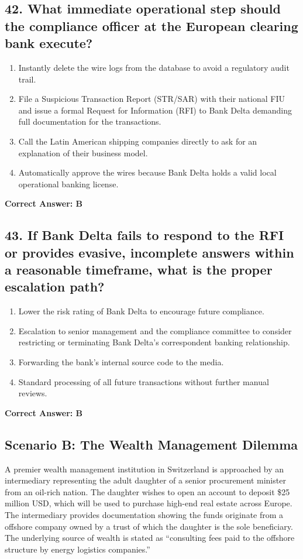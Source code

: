 \documentclass[11pt,a4paper]{article}
\begin{document}
	\subsection{42. What immediate operational step should the compliance officer at the European clearing bank execute?}
	\begin{enumerate}[label=\Alph*.]
		\item Instantly delete the wire logs from the database to avoid a regulatory audit trail.
		\item File a Suspicious Transaction Report (STR/SAR) with their national FIU and issue a formal Request for Information (RFI) to Bank Delta demanding full documentation for the transactions.
		\item Call the Latin American shipping companies directly to ask for an explanation of their business model.
		\item Automatically approve the wires because Bank Delta holds a valid local operational banking license.
	\end{enumerate}
	\textbf{Correct Answer: B}
	
	\subsection{43. If Bank Delta fails to respond to the RFI or provides evasive, incomplete answers within a reasonable timeframe, what is the proper escalation path?}
	\begin{enumerate}[label=\Alph*.]
		\item Lower the risk rating of Bank Delta to encourage future compliance.
		\item Escalation to senior management and the compliance committee to consider restricting or terminating Bank Delta's correspondent banking relationship.
		\item Forwarding the bank's internal source code to the media.
		\item Standard processing of all future transactions without further manual reviews.
	\end{enumerate}
	\textbf{Correct Answer: B}
	
	\subsection*{Scenario B: The Wealth Management Dilemma}
	A premier wealth management institution in Switzerland is approached by an intermediary representing the adult daughter of a senior procurement minister from an oil-rich nation. The daughter wishes to open an account to deposit \$25 million USD, which will be used to purchase high-end real estate across Europe. The intermediary provides documentation showing the funds originate from a offshore company owned by a trust of which the daughter is the sole beneficiary. The underlying source of wealth is stated as ``consulting fees paid to the offshore structure by energy logistics companies.''
	
\end{document}

